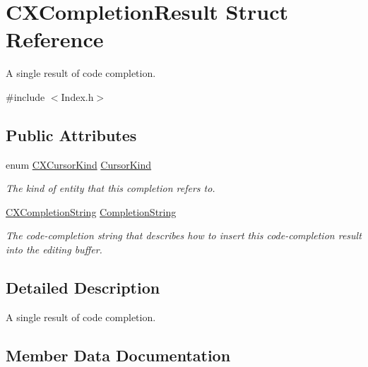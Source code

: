 \hypertarget{structCXCompletionResult}{}\section{C\+X\+Completion\+Result Struct Reference}
\label{structCXCompletionResult}


A single result of code completion.  




{\ttfamily \#include $<$Index.\+h$>$}

\subsection*{Public Attributes}
\begin{DoxyCompactItemize}
\item 
enum \hyperlink{group__CINDEX_gaaccc432245b4cd9f2d470913f9ef0013}{C\+X\+Cursor\+Kind} \hyperlink{structCXCompletionResult_adfd21960b683399da375ff0ed10527b7}{Cursor\+Kind}
\begin{DoxyCompactList}\small\item\em The kind of entity that this completion refers to. \end{DoxyCompactList}\item 
\mbox{\label{structCXCompletionResult_a4576d7df8f0782b9dc6493a68e605c80}} 
\hyperlink{group__CINDEX__CODE__COMPLET_gafea23a43a60ec3b4f3bedccfbb76883a}{C\+X\+Completion\+String} \hyperlink{structCXCompletionResult_a4576d7df8f0782b9dc6493a68e605c80}{Completion\+String}
\begin{DoxyCompactList}\small\item\em The code-\/completion string that describes how to insert this code-\/completion result into the editing buffer. \end{DoxyCompactList}\end{DoxyCompactItemize}


\subsection{Detailed Description}
A single result of code completion. 

\subsection{Member Data Documentation}
\mbox{\label{structCXCompletionResult_adfd21960b683399da375ff0ed10527b7}} 
